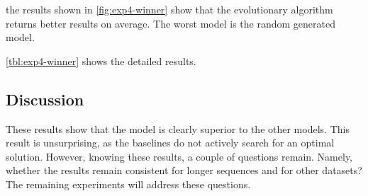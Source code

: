 \documentclass[./../../paper.tex]{subfiles}
\begin{document}
\noindent the results shown in \autoref{fig:exp4-winner} show that the evolutionary algorithm  returns better results on average. The worst model is the random generated model.  

\autoref{tbl:exp4-winner} shows the detailed results.




\subsection{Discussion}
These results show that the model  is clearly superior to the other models. This result is unsurprising, as the baselines do not actively search for an optimal solution. However, knowing these results, a couple of questions remain. Namely, whether the results remain consistent for longer sequences and for other datasets?  The remaining experiments will address these questions. 
\end{document}
